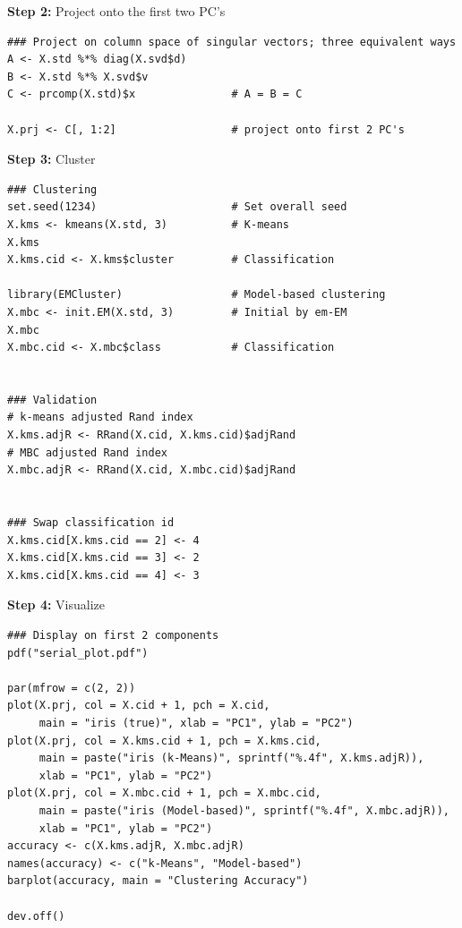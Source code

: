 \textbf{Step 2:}  Project onto the first two PC's\vspace{-.6cm}
\begin{lstlisting}[language=rr]
### Project on column space of singular vectors; three equivalent ways
A <- X.std %*% diag(X.svd$d)
B <- X.std %*% X.svd$v
C <- prcomp(X.std)$x               # A = B = C

X.prj <- C[, 1:2]                  # project onto first 2 PC's
\end{lstlisting}

\textbf{Step 3:}  Cluster\vspace{-.6cm}
\begin{lstlisting}[language=rr]
### Clustering
set.seed(1234)                     # Set overall seed
X.kms <- kmeans(X.std, 3)          # K-means
X.kms
X.kms.cid <- X.kms$cluster         # Classification

library(EMCluster)                 # Model-based clustering
X.mbc <- init.EM(X.std, 3)         # Initial by em-EM
X.mbc
X.mbc.cid <- X.mbc$class           # Classification


### Validation
# k-means adjusted Rand index
X.kms.adjR <- RRand(X.cid, X.kms.cid)$adjRand 
# MBC adjusted Rand index
X.mbc.adjR <- RRand(X.cid, X.mbc.cid)$adjRand  


### Swap classification id
X.kms.cid[X.kms.cid == 2] <- 4
X.kms.cid[X.kms.cid == 3] <- 2
X.kms.cid[X.kms.cid == 4] <- 3
\end{lstlisting}

\textbf{Step 4:}  Visualize\vspace{-.6cm}
\begin{lstlisting}[language=rr]
### Display on first 2 components
pdf("serial_plot.pdf")

par(mfrow = c(2, 2))
plot(X.prj, col = X.cid + 1, pch = X.cid,
     main = "iris (true)", xlab = "PC1", ylab = "PC2")
plot(X.prj, col = X.kms.cid + 1, pch = X.kms.cid,
     main = paste("iris (k-Means)", sprintf("%.4f", X.kms.adjR)),
     xlab = "PC1", ylab = "PC2")
plot(X.prj, col = X.mbc.cid + 1, pch = X.mbc.cid,
     main = paste("iris (Model-based)", sprintf("%.4f", X.mbc.adjR)),
     xlab = "PC1", ylab = "PC2")
accuracy <- c(X.kms.adjR, X.mbc.adjR)
names(accuracy) <- c("k-Means", "Model-based")
barplot(accuracy, main = "Clustering Accuracy")

dev.off()
\end{lstlisting}

